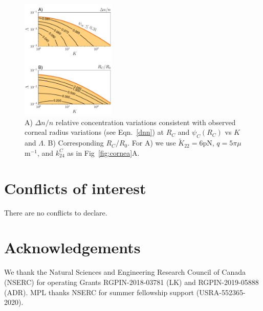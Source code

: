 \documentclass[twoside,twocolumn,9pt]{article}
\renewcommand{\refname}{Notes and references}
\begin{document}
\begin{figure}[t!] %
   \centering
   \includegraphics[width=0.4\textwidth]{figure10.pdf} 
   \caption{A) $\Delta n/n$ relative concentration variations consistent with observed corneal radius variations (see Eqn.~\ref{dnn}) at $R_C$ and $\psi_C(R_C)$ vs $K$ and $\Lambda$.
   B) Corresponding $R_C/R_0$. For A) we use $\tilde{K}_{22}=6$pN, $q=5\pi\mu$m$^{-1}$, and $k_{24}^C$ as in Fig~\ref{fig:cornea}A. }
   \label{fig:deltann}
\end{figure}

\section*{Conflicts of interest}
There are no conflicts to declare.

\section*{Acknowledgements}
We thank the Natural Sciences and Engineering Research Council of Canada (NSERC) for operating Grants RGPIN-2018-03781 (LK) and RGPIN-2019-05888 (ADR). MPL thanks NSERC for summer fellowship support (USRA-552365-2020).

\newpage
\renewcommand\refname{Notes and references} %
 
\end{document}
